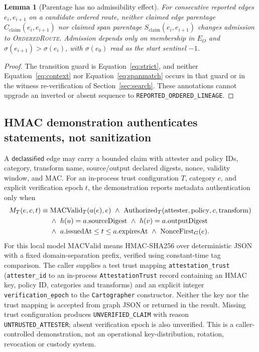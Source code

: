 \documentclass[11pt,letterpaper]{article}
\newtheorem{lemma}{Lemma}
\newcommand{\code}[1]{\texttt{#1}}
\newcommand{\st}[1]{\texttt{\scriptsize #1}}
\begin{document}
\begin{lemma}[Parentage has no admissibility effect]\label{lem:parent}
For consecutive reported edges \(e_i,e_{i+1}\) on a candidate ordered route,
neither claimed edge parentage \(C_{\mathrm{claim}}(e_i,e_{i+1})\) nor claimed
span parentage \(S_{\mathrm{claim}}(e_i,e_{i+1})\) changes admission to
\textup{\textsc{OrderedRoute}}. Admission depends only on membership in \(E_O\) and
\(\sigma(e_{i+1})>\sigma(e_i)\), with \(\sigma(e_0)\) read as the start sentinel \(-1\).
\end{lemma}
\begin{proof}
The transition guard is Equation~\eqref{eq:strict}, and
neither Equation~\eqref{eq:context} nor Equation~\eqref{eq:spanmatch} occurs
in that guard or in the witness re-verification of Section~\ref{sec:search}. These annotations cannot upgrade an inverted or absent
sequence to \st{REPORTED\_ORDERED\_LINEAGE}.
\end{proof}

\subsection{HMAC demonstration authenticates statements, not sanitization}
A \(\mathsf{declassified}\) edge may carry a bounded claim with attester and policy IDs, category, transform name, source/output declared digests, nonce, validity window, and MAC. For an in-process trust configuration \(T\), category \(c\), and explicit verification epoch \(t\), the demonstration reports metadata authentication only when
\begin{align}
M_T(e,c,t) \equiv {} & \mathrm{MACValid}_T(a(e),e)\ \land\ \mathrm{Authorized}_T(\mathrm{attester},\mathrm{policy},c,\mathrm{transform}) \notag\\
&\land\ h(u)=a.\mathrm{sourceDigest}\ \land\ h(v)=a.\mathrm{outputDigest} \notag\\
&\land\ a.\mathrm{issuedAt}\le t\le a.\mathrm{expiresAt}\ \land\ \mathrm{NonceFirst}_G(e).\label{eq:mac}
\end{align}
For this local model \(\mathrm{MACValid}\) means HMAC-SHA256 over deterministic JSON with a fixed domain-separation prefix, verified using constant-time tag comparison. The caller supplies a test trust mapping \code{attestation\_trust} (\code{attester\_id} to an in-process \code{AttestationTrust} record containing an HMAC key, policy ID, categories and transforms) and an explicit integer \code{verification\_epoch} to the \code{Cartographer} constructor. Neither the key nor the trust mapping is accepted from graph JSON or returned in the result. Missing trust configuration produces \code{UNVERIFIED\_CLAIM} with reason \code{UNTRUSTED\_ATTESTER}; absent verification epoch is also unverified. This is a caller-controlled demonstration, not an operational key-distribution, rotation, revocation or custody system.
\end{document}

